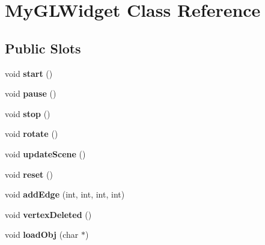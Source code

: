 \hypertarget{class_my_g_l_widget}{\section{My\-G\-L\-Widget Class Reference}
\label{class_my_g_l_widget}
}
\subsection*{Public Slots}
\begin{DoxyCompactItemize}
\item 
\hypertarget{class_my_g_l_widget_a7ca66eeb44a091e97c775b2319fef8ac}{void {\bfseries start} ()}\label{class_my_g_l_widget_a7ca66eeb44a091e97c775b2319fef8ac}

\item 
\hypertarget{class_my_g_l_widget_aea92baa0457f49e64dfee60f92880dc8}{void {\bfseries pause} ()}\label{class_my_g_l_widget_aea92baa0457f49e64dfee60f92880dc8}

\item 
\hypertarget{class_my_g_l_widget_a492c942b0b46cb0e8ff3d9278ffe4080}{void {\bfseries stop} ()}\label{class_my_g_l_widget_a492c942b0b46cb0e8ff3d9278ffe4080}

\item 
\hypertarget{class_my_g_l_widget_a4db24168a024b607a31110aa50b5da90}{void {\bfseries rotate} ()}\label{class_my_g_l_widget_a4db24168a024b607a31110aa50b5da90}

\item 
\hypertarget{class_my_g_l_widget_a409afa847e655693b50e584c864e0c3a}{void {\bfseries update\-Scene} ()}\label{class_my_g_l_widget_a409afa847e655693b50e584c864e0c3a}

\item 
\hypertarget{class_my_g_l_widget_aa752cbdcd11129ce7cac86b06a9ef7f2}{void {\bfseries reset} ()}\label{class_my_g_l_widget_aa752cbdcd11129ce7cac86b06a9ef7f2}

\item 
\hypertarget{class_my_g_l_widget_a1b69ad0c3962908941983a30b13b1162}{void {\bfseries add\-Edge} (int, int, int, int)}\label{class_my_g_l_widget_a1b69ad0c3962908941983a30b13b1162}

\item 
\hypertarget{class_my_g_l_widget_a470437e6ff9ba7b937511c6db7863533}{void {\bfseries vertex\-Deleted} ()}\label{class_my_g_l_widget_a470437e6ff9ba7b937511c6db7863533}

\item 
\hypertarget{class_my_g_l_widget_ade438c09dbf4e36116f605189c2b4440}{void {\bfseries load\-Obj} (char $\ast$)}\label{class_my_g_l_widget_ade438c09dbf4e36116f605189c2b4440}


\end{DoxyCompactItemize}
